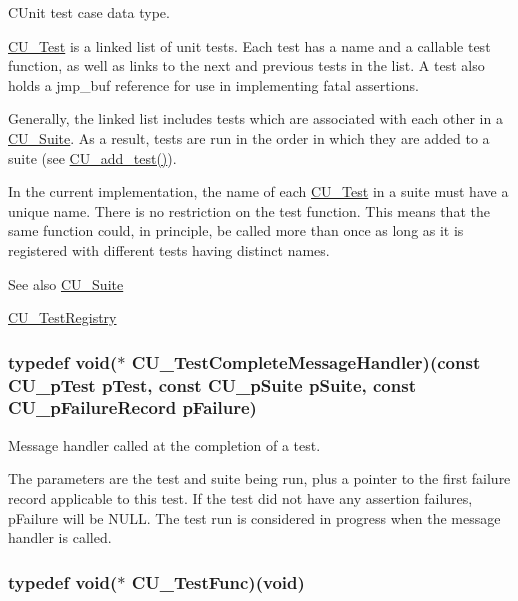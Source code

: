 C\+Unit test case data type. 

\hyperlink{struct_c_u___test}{C\+U\+\_\+\+Test} is a linked list of unit tests. Each test has a name and a callable test function, as well as links to the next and previous tests in the list. A test also holds a jmp\+\_\+buf reference for use in implementing fatal assertions. 

Generally, the linked list includes tests which are associated with each other in a \hyperlink{struct_c_u___suite}{C\+U\+\_\+\+Suite}. As a result, tests are run in the order in which they are added to a suite (see \hyperlink{group___framework_gad9f198a8a5fa8cc6870c3c8be873869f}{C\+U\+\_\+add\+\_\+test()}). 

In the current implementation, the name of each \hyperlink{struct_c_u___test}{C\+U\+\_\+\+Test} in a suite must have a unique name. There is no restriction on the test function. This means that the same function could, in principle, be called more than once as long as it is registered with different tests having distinct names. \begin{DoxySeeAlso}{See also}
\hyperlink{struct_c_u___suite}{C\+U\+\_\+\+Suite} 

\hyperlink{struct_c_u___test_registry}{C\+U\+\_\+\+Test\+Registry} 
\end{DoxySeeAlso}
\hypertarget{group___framework_ga2c11da75531b097ca037223489bf02be}{
\subsubsection[{C\+U\+\_\+\+Test\+Complete\+Message\+Handler}]{\setlength{\rightskip}{0pt plus 5cm}typedef void($\ast$ C\+U\+\_\+\+Test\+Complete\+Message\+Handler)(const {\bf C\+U\+\_\+p\+Test} p\+Test, const {\bf C\+U\+\_\+p\+Suite} p\+Suite, const {\bf C\+U\+\_\+p\+Failure\+Record} p\+Failure)}}\label{group___framework_ga2c11da75531b097ca037223489bf02be}


Message handler called at the completion of a test. 

The parameters are the test and suite being run, plus a pointer to the first failure record applicable to this test. If the test did not have any assertion failures, p\+Failure will be N\+U\+L\+L. The test run is considered in progress when the message handler is called. \hypertarget{group___framework_ga5868148b642b30635b8fe7f095c5b493}{
\subsubsection[{C\+U\+\_\+\+Test\+Func}]{\setlength{\rightskip}{0pt plus 5cm}typedef void($\ast$ C\+U\+\_\+\+Test\+Func)(void)}}\label{group___framework_ga5868148b642b30635b8fe7f095c5b493}


